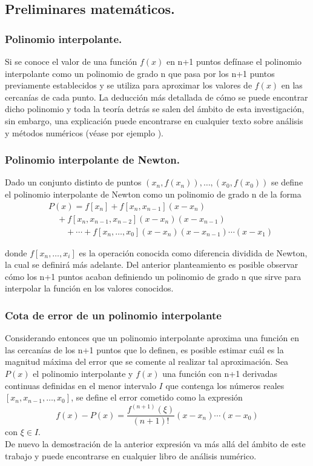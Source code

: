 \subsection{Preliminares matemáticos.}
\subsubsection{Polinomio interpolante.}
Si se conoce el valor de una función $f(x)$ en n+1 puntos defínase el polinomio
interpolante como un polinomio de grado n que pasa por los n+1 puntos
previamente establecidos y se utiliza para aproximar los valores de $f(x)$ en las cercanías de cada punto.
La deducción más detallada de cómo se puede encontrar dicho polinomio y toda la teoría detrás
se salen del ámbito de esta investigación, sin embargo, una explicación puede encontrarse en cualquier texto
sobre análisis y métodos numéricos (véase por ejemplo \cite{atkinson}).
\subsubsection{Polinomio interpolante de Newton.}
\begin{definition}
    \label{newton_poly}
    Dado un conjunto distinto de puntos $(x_n,f(x_n)),\ldots,(x_0,f(x_0))$ se define
    el polinomio interpolante de Newton como un polinomio de grado n de la forma
    \begin{equation}
        \begin{split}
            &P(x) =f[x_n]+f[x_n,x_{n-1}](x-x_n)\\
            &\quad +f[x_n,x_{n-1},x_{n-2}](x-x_n)(x-x_{n-1})\\
            &\qquad + \cdots + f[x_n,\ldots,x_0](x-x_n)(x-x_{n-1})\cdots(x-x_1) 
        \end{split} 
    \end{equation}  
\end{definition}
donde $f[x_n,\ldots,x_i]$ es la operación conocida como diferencia dividida de Newton,
la cual se definirá más adelante. Del anterior planteamiento es posible observar cómo
los n+1 puntos acaban definiendo un polinomio de grado n que sirve para interpolar
la función en los valores conocidos.
\subsubsection{Cota de error de un polinomio interpolante}
Considerando entonces que un polinomio interpolante aproxima una función 
en las cercanías de los n+1 puntos que lo definen, es posible estimar cuál es
la magnitud máxima del error que se comente al realizar tal aproximación. Sea $P(x)$ el
polinomio interpolante y $f(x)$ una función con n+1 derivadas continuas definidas en el menor intervalo $I$ que contenga los números reales $[x_n,x_{n-1},\ldots,x_0]$,
se define el error cometido como la expresión
\begin{equation}
    \label{lagrange_error}
    f(x)-P(x)=\frac{f^{\left(n+1\right)}(\xi)}{(n+1)!}(x-x_n)\cdots(x-x_0)
\end{equation}
con $\xi \in I$. \\De nuevo la demostración de la anterior expresión
va más allá del ámbito de este trabajo y puede encontrarse en cualquier
libro de análisis numérico.
